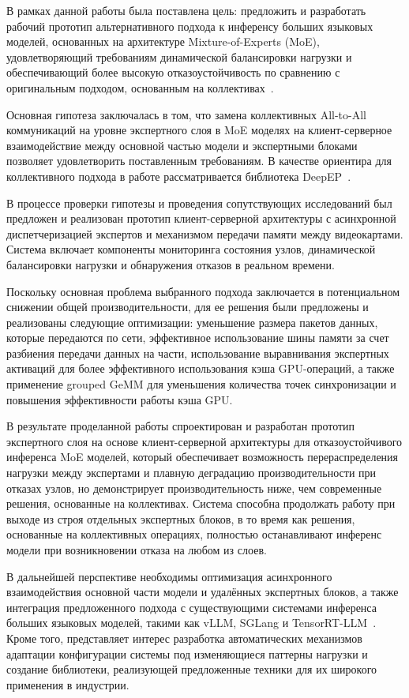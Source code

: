В рамках данной работы была поставлена цель: предложить и разработать рабочий прототип альтернативного подхода к инференсу больших языковых моделей, основанных на архитектуре Mixture-of-Experts (MoE), удовлетворяющий требованиям динамической балансировки нагрузки и обеспечивающий более высокую отказоустойчивость по сравнению с оригинальным подходом, основанным на коллективах~\cite{shazeer2017moe,rajbhandari2022deepspeedmoe}.

Основная гипотеза заключалась в том, что замена коллективных All-to-All коммуникаций на уровне экспертного слоя в MoE моделях на клиент-серверное взаимодействие между основной частью модели и экспертными блоками позволяет удовлетворить поставленным требованиям. В качестве ориентира для коллективного подхода в работе рассматривается библиотека DeepEP~\cite{deepseekDeepEP}.

В процессе проверки гипотезы и проведения сопутствующих исследований был предложен и реализован прототип клиент-серверной архитектуры с асинхронной диспетчеризацией экспертов и механизмом передачи памяти между видеокартами. Система включает компоненты мониторинга состояния узлов, динамической балансировки нагрузки и обнаружения отказов в реальном времени.

Поскольку основная проблема выбранного подхода заключается в потенциальном снижении общей производительности, для ее решения были предложены и реализованы следующие оптимизации: уменьшение размера пакетов данных, которые передаются по сети, эффективное использование шины памяти за счет разбиения передачи данных на части, использование выравнивания экспертных активаций для более эффективного использования кэша GPU-операций, а также применение grouped GeMM для уменьшения количества точек синхронизации и повышения эффективности работы кэша GPU.

В результате проделанной работы спроектирован и разработан прототип экспертного слоя на основе клиент-серверной архитектуры для отказоустойчивого инференса MoE моделей, который обеспечивает возможность перераспределения нагрузки между экспертами и плавную деградацию производительности при отказах узлов, но демонстрирует производительность ниже, чем современные решения, основанные на коллективах. Система способна продолжать работу при выходе из строя отдельных экспертных блоков, в то время как решения, основанные на коллективных операциях, полностью останавливают инференс модели при возникновении отказа на любом из слоев.

В дальнейшей перспективе необходимы оптимизация асинхронного взаимодействия основной части модели и удалённых экспертных блоков, а также интеграция предложенного подхода с существующими системами инференса больших языковых моделей, такими как vLLM, SGLang и TensorRT-LLM~\cite{vllmProject,sglangProject,nvidiaTensorRTLLM}. Кроме того, представляет интерес разработка автоматических механизмов адаптации конфигурации системы под изменяющиеся паттерны нагрузки и создание библиотеки, реализующей предложенные техники для их широкого применения в индустрии.
